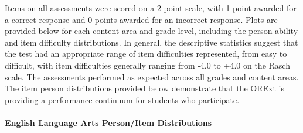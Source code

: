 \documentclass[]{article}
\let\oldparagraph\paragraph
\renewcommand{\paragraph}[1]{\oldparagraph{#1}\mbox{}}
\begin{document}
Items on all assessments were scored on a 2-point scale, with 1 point
awarded for a correct response and 0 points awarded for an incorrect
response. Plots are provided below for each content area and grade
level, including the person ability and item difficulty distributions.
In general, the descriptive statistics suggest that the test had an
appropriate range of item difficulties represented, from easy to
difficult, with item difficulties generally ranging from -4.0 to +4.0 on
the Rasch scale. The assessments performed as expected across all grades
and content areas. The item person distributions provided below
demonstrate that the ORExt is providing a performance continuum for
students who participate.

\pagebreak

\hypertarget{english-language-arts-personitem-distributions}{%
\paragraph{English Language Arts Person/Item
Distributions}\label{english-language-arts-personitem-distributions}}

\FloatBarrier
\end{document}
